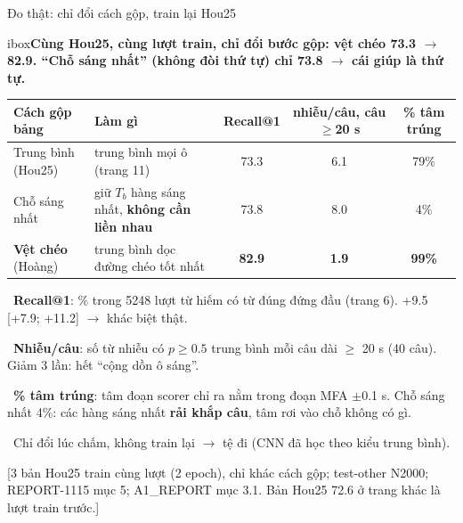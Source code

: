 \documentclass[aspectratio=169,xcolor=table]{beamer}
\newcommand{\good}[1]{\textcolor{GoodGreen}{\textbf{#1}}}
\newcommand{\src}[1]{\par\vfill{\tiny\color{TextGray}[#1]}}
\newcommand{\ra}{$\rightarrow$}
\newcommand{\nb}[1]{\textcolor{Accent}{#1}}
\newcommand{\insight}[1]{\begin{beamercolorbox}[sep=0.55em,rounded=true]{ibox}\small\bfseries #1\end{beamercolorbox}\vspace{0.15cm}}
\begin{document}
\begin{frame}{Đo thật: chỉ đổi cách gộp, train lại Hou25}
\insight{Cùng Hou25, cùng lượt train, chỉ đổi bước gộp: vệt chéo \nb{73.3 \ra{} 82.9}. ``Chỗ sáng nhất'' (không đòi thứ tự) chỉ \nb{73.8} \ra{} cái giúp là \nb{thứ tự}.}
\renewcommand{\arraystretch}{1.12}\scriptsize\setlength{\tabcolsep}{3pt}
\begin{tabular}{L{2.4cm}L{4.4cm}ccc}
\toprule
Cách gộp bảng & Làm gì & Recall@1 & nhiễu/câu, câu $\geq$20 s & \% tâm trúng \\
\midrule
Trung bình (Hou25) & trung bình mọi ô (trang 11) & 73.3 & 6.1 & 79\% \\
Chỗ sáng nhất & giữ $T_b$ hàng sáng nhất, \textbf{không cần liền nhau} & 73.8 & 8.0 & 4\% \\
\textbf{Vệt chéo} (Hoàng) & trung bình dọc đường chéo tốt nhất & \good{82.9} & \good{1.9} & \good{99\%} \\
\bottomrule
\end{tabular}
\par\vspace{0.12cm}
{\scriptsize
\textbullet\ \textbf{Recall@1}: \% trong 5248 lượt từ hiếm có từ đúng đứng đầu (trang 6). +9.5 [+7.9; +11.2] \ra{} khác biệt thật.\par
\textbullet\ \textbf{Nhiễu/câu}: số từ nhiễu có $p \geq 0.5$ trung bình mỗi câu dài $\geq$ 20 s (40 câu). Giảm 3 lần: hết ``cộng dồn ô sáng''.\par
\textbullet\ \textbf{\% tâm trúng}: tâm đoạn scorer chỉ ra nằm trong đoạn MFA $\pm$0.1 s. Chỗ sáng nhất 4\%: các hàng sáng nhất \textbf{rải khắp câu}, tâm rơi vào chỗ không có gì.\par
\textbullet\ Chỉ đổi lúc chấm, không train lại \ra{} tệ đi (CNN đã học theo kiểu trung bình).\par}
\src{3 bản Hou25 train cùng lượt (2 epoch), chỉ khác cách gộp; test-other N2000; REPORT-1115 mục 5; A1\_REPORT mục 3.1. Bản Hou25 72.6 ở trang khác là lượt train trước.}
\end{frame}
\end{document}
